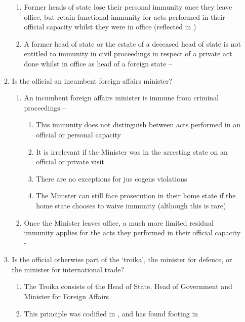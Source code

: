 \begin{enumerate}
\begin{enumerate}
\begin{enumerate}
            \item Former heads of state lose their personal immunity once they leave office, but retain functional immunity for acts performed in their official capacity whilst they were in office (reflected in )
            \item A former head of state or the estate of a deceased head of state is not entitled to immunity in civil proceedings in respect of a private act done whilst in office as head of a foreign state -- 
        \end{enumerate}
        \item Is the official an incumbent foreign affairs minister?
        \begin{enumerate}
            \item An incumbent foreign affairs minister is immune from criminal proceedings -- 
            \begin{enumerate}
                \item This immunity does not distinguish between acts performed in an official or personal capacity
                \item It is irrelevant if the Minister was in the arresting state on an official or private visit
                \item There are no exceptions for \gls{jus cogens} violations
                \item The Minister can still face prosecution in their home state if the home state chooses to waive immunity (although this is rare)
            \end{enumerate}
            \item Once the Minister leaves office, a much more limited residual immunity applies for the acts they performed in their official capacity - 
        \end{enumerate}
        \item Is the official otherwise part of the `troika', the minister for defence, or the minister for international trade?
        \begin{enumerate}
            \item The Troika consists of the Head of State, Head of Government and Minister for Foreign Affairs
            \item This principle was codified in , and has found footing in 

\end{enumerate}
\end{enumerate}
\end{enumerate}
